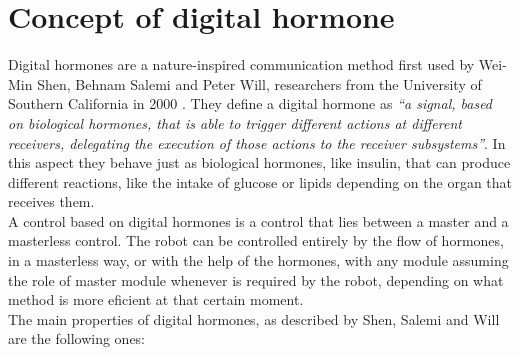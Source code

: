 \section{Concept of digital hormone}
\label{hormone_concept}

Digital hormones are a nature-inspired communication method first used by Wei-Min Shen, Behnam Salemi and Peter Will, researchers from the University of Southern California in 2000 \cite{Shen2000a}. They define a digital hormone as \emph{``a signal, based on biological hormones, that is able to trigger different actions at different receivers, delegating the execution of those actions to the receiver subsystems''}. In this aspect they behave just as biological hormones, like insulin, that can produce different reactions, like the intake of glucose or lipids depending on the organ that receives them. \\

A control based on digital hormones is a control that lies between a master and a masterless control. The robot can be controlled entirely by the flow of hormones, in a masterless way, or with the help of the hormones, with any module assuming the role of master module whenever is required by the robot, depending on what method is more eficient at that certain moment.\\

The main properties of digital hormones, as described by Shen, Salemi and Will are the following ones:

